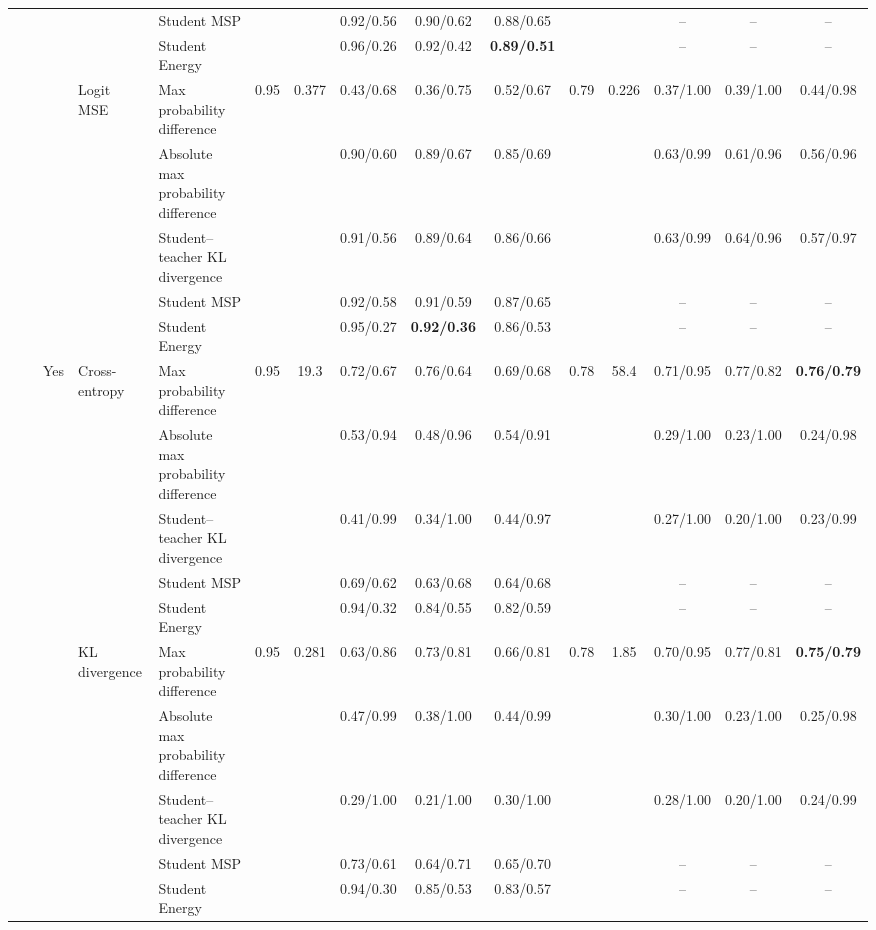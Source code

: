 \documentclass[border=2pt]{standalone}
\begin{document}
\begin{tabular}{lllllcccccccccc}
 &  &  &  & Student MSP &  &  & 0.92/0.56 & 0.90/0.62 & 0.88/0.65 &  &  & -- & -- & -- \\
 &  &  &  & Student Energy &  &  & 0.96/0.26 & 0.92/0.42 & \textbf{0.89/0.51} &  &  & -- & -- & -- \\
 &  &  & Logit MSE & Max probability difference & 0.95 & 0.377 & 0.43/0.68 & 0.36/0.75 & 0.52/0.67 & 0.79 & 0.226 & 0.37/1.00 & 0.39/1.00 & 0.44/0.98 \\
 &  &  &  & Absolute max probability difference &  &  & 0.90/0.60 & 0.89/0.67 & 0.85/0.69 &  &  & 0.63/0.99 & 0.61/0.96 & 0.56/0.96 \\
 &  &  &  & Student--teacher KL divergence &  &  & 0.91/0.56 & 0.89/0.64 & 0.86/0.66 &  &  & 0.63/0.99 & 0.64/0.96 & 0.57/0.97 \\
 &  &  &  & Student MSP &  &  & 0.92/0.58 & 0.91/0.59 & 0.87/0.65 &  &  & -- & -- & -- \\
 &  &  &  & Student Energy &  &  & 0.95/0.27 & \textbf{0.92/0.36} & 0.86/0.53 &  &  & -- & -- & -- \\
 &  & Yes & Cross-entropy & Max probability difference & 0.95 & 19.3 & 0.72/0.67 & 0.76/0.64 & 0.69/0.68 & 0.78 & 58.4 & 0.71/0.95 & 0.77/0.82 & \textbf{0.76/0.79} \\
 &  &  &  & Absolute max probability difference &  &  & 0.53/0.94 & 0.48/0.96 & 0.54/0.91 &  &  & 0.29/1.00 & 0.23/1.00 & 0.24/0.98 \\
 &  &  &  & Student--teacher KL divergence &  &  & 0.41/0.99 & 0.34/1.00 & 0.44/0.97 &  &  & 0.27/1.00 & 0.20/1.00 & 0.23/0.99 \\
 &  &  &  & Student MSP &  &  & 0.69/0.62 & 0.63/0.68 & 0.64/0.68 &  &  & -- & -- & -- \\
 &  &  &  & Student Energy &  &  & 0.94/0.32 & 0.84/0.55 & 0.82/0.59 &  &  & -- & -- & -- \\
 &  &  & KL divergence & Max probability difference & 0.95 & 0.281 & 0.63/0.86 & 0.73/0.81 & 0.66/0.81 & 0.78 & 1.85 & 0.70/0.95 & 0.77/0.81 & \textbf{0.75/0.79} \\
 &  &  &  & Absolute max probability difference &  &  & 0.47/0.99 & 0.38/1.00 & 0.44/0.99 &  &  & 0.30/1.00 & 0.23/1.00 & 0.25/0.98 \\
 &  &  &  & Student--teacher KL divergence &  &  & 0.29/1.00 & 0.21/1.00 & 0.30/1.00 &  &  & 0.28/1.00 & 0.20/1.00 & 0.24/0.99 \\
 &  &  &  & Student MSP &  &  & 0.73/0.61 & 0.64/0.71 & 0.65/0.70 &  &  & -- & -- & -- \\
 &  &  &  & Student Energy &  &  & 0.94/0.30 & 0.85/0.53 & 0.83/0.57 &  &  & -- & -- & -- \\

\end{tabular}
\end{document}
